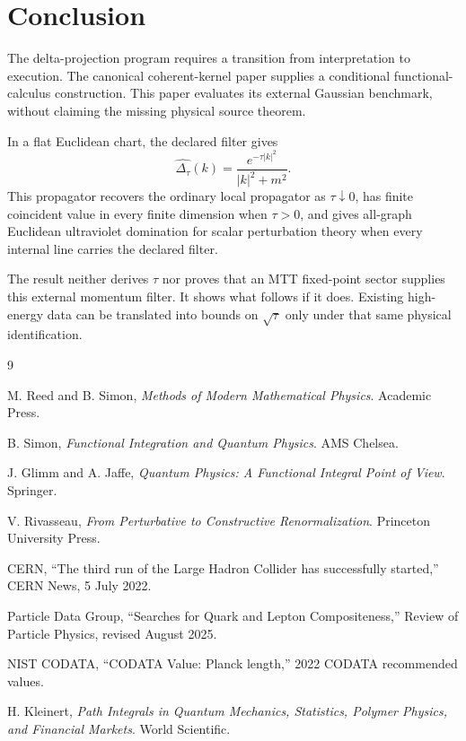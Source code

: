 \documentclass[11pt]{article}
\begin{document}
\section{Conclusion}

The delta-projection program requires a transition from interpretation to execution.  The
canonical coherent-kernel paper supplies a conditional functional-calculus construction.  This
paper evaluates its external Gaussian benchmark, without claiming the missing physical
source theorem.

In a flat Euclidean chart, the declared filter gives
\[
        \widehat{\Delta_\tau}(k)
        =
        \frac{e^{-\tau |k|^2}}{|k|^2+m^2}.
\]
This propagator recovers the ordinary local propagator as \(\tau\downarrow0\), has finite
coincident value in every finite dimension when \(\tau>0\), and gives all-graph Euclidean
ultraviolet domination for scalar perturbation theory when every internal line carries the
declared filter.

The result neither derives \(\tau\) nor proves that an MTT fixed-point sector supplies this
external momentum filter.  It shows what follows if it does.  Existing high-energy data can be
translated into bounds on \(\sqrt{\tau}\) only under that same physical identification.

\begin{center}
\end{center}

\begin{thebibliography}{9}

M. Reed and B. Simon,
\emph{Methods of Modern Mathematical Physics}.
Academic Press.

B. Simon,
\emph{Functional Integration and Quantum Physics}.
AMS Chelsea.

J. Glimm and A. Jaffe,
\emph{Quantum Physics: A Functional Integral Point of View}.
Springer.

V. Rivasseau,
\emph{From Perturbative to Constructive Renormalization}.
Princeton University Press.


CERN,
``The third run of the Large Hadron Collider has successfully started,''
CERN News, 5 July 2022.

Particle Data Group,
``Searches for Quark and Lepton Compositeness,''
Review of Particle Physics, revised August 2025.

NIST CODATA,
``CODATA Value: Planck length,''
2022 CODATA recommended values.


H. Kleinert,
\emph{Path Integrals in Quantum Mechanics, Statistics, Polymer Physics, and Financial Markets}.
World Scientific.

\end{thebibliography}
\end{document}
